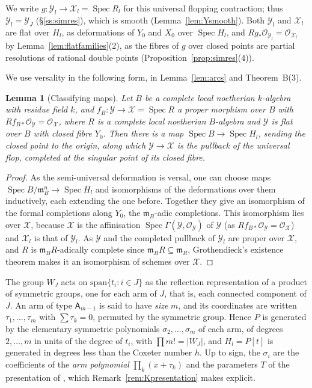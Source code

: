 \documentclass[11pt]{amsart}
\makeatletter
\numberwithin{table}{section}
\numberwithin{figure}{section}
\numberwithin{equation}{section}
\newtheorem{lem}[thm]{Lemma}
\theoremstyle{definition}
\theoremstyle{plain}
\newcommand{\cO}{\mathcal{O}}
\newcommand{\cX}{\mathcal{X}}
\newcommand{\cY}{\mathcal{Y}}
\DeclareMathOperator{\Spec}{Spec}
\renewcommand\paragraph{\@startsection{paragraph}{4}{\z@}{\medskipamount}{-.5em}{\normalfont\bfseries}}
\makeatother
\begin{document}
We write $g\colon \cY_l \to \cX_l = \Spec R_l$ for this universal flopping contraction; thus $\cY_l = \cY_J$ (\S\ref{ss:simres}), which is smooth (Lemma~\ref{lem:Ysmooth}). Both $\cY_l$ and $\cX_l$ are flat over $H_l$, as deformations of $Y_0$ and $X_0$ over $\Spec H_l$, and $Rg_*\cO_{\cY_l} = \cO_{\cX_l}$ by Lemma~\ref{lem:flatfamilies}(2), as the fibres of $g$ over closed points are partial resolutions of rational double points (Proposition~\ref{prop:simres}(4)).

We use versality in the following form, in Lemma~\ref{lem:arcs} and Theorem~B(3).

\begin{lem}[Classifying maps]\label{lem:classifying}
Let $B$ be a complete local noetherian $k$-algebra with residue field $k$, and $f_B\colon \mathcal Y \to \mathcal X = \Spec R$ a proper morphism over $B$ with $Rf_{B*}\cO_{\mathcal Y} = \cO_{\mathcal X}$, where $R$ is a complete local noetherian $B$-algebra and $\mathcal Y$ is flat over $B$ with closed fibre $Y_0$. Then there is a map $\Spec B \to \Spec H_l$, sending the closed point to the origin, along which $\mathcal Y \to \mathcal X$ is the pullback of the universal flop, completed at the singular point of its closed fibre.
\end{lem}

\begin{proof}
As the semi-universal deformation is versal, one can choose maps $\Spec B/\mathfrak m_B^n \to \Spec H_l$ and isomorphisms of the deformations over them inductively, each extending the one before. Together they give an isomorphism of the formal completions along $Y_0$, the $\mathfrak m_B$-adic completions. This isomorphism lies over $\mathcal X$, because $\mathcal X$ is the affinisation $\Spec \Gamma(\mathcal Y, \cO_{\mathcal Y})$ of $\mathcal Y$ (as $Rf_{B*}\cO_{\mathcal Y} = \cO_{\mathcal X}$) and $\cX_l$ is that of $\cY_l$. As $\mathcal Y$ and the completed pullback of $\cY_l$ are proper over $\mathcal X$, and $R$ is $\mathfrak m_B R$-adically complete since $\mathfrak m_B R \subseteq \mathfrak m_R$, Grothendieck's existence theorem makes it an isomorphism of schemes over $\mathcal X$.
\end{proof}

\paragraph{Generators of $H_l$.} The group $W_J$ acts on $\mathrm{span}\{t_i : i \in J\}$ as the reflection representation of a product of symmetric groups, one for each arm of $J$, that is, each connected component of $J$. An arm of type $\mathsf{A}_{m-1}$ is said to have \emph{size} $m$, and its coordinates are written $\tau_1, \dots, \tau_m$ with $\sum \tau_k = 0$, permuted by the symmetric group. Hence $P$ is generated by the elementary symmetric polynomials $\sigma_2, \dots, \sigma_m$ of each arm, of degrees $2, \dots, m$ in units of the degree of $t_i$, with $\prod m! = |W_J|$, and $H_l = P[t]$ is generated in degrees less than the Coxeter number $h$. Up to sign, the $\sigma_i$ are the coefficients of the \emph{arm polynomial} $\prod_k (x + \tau_k)$ and the parameters $T$ of the presentation of \cite{K}, which Remark~\ref{rem:Kpresentation} makes explicit.
\end{document}
